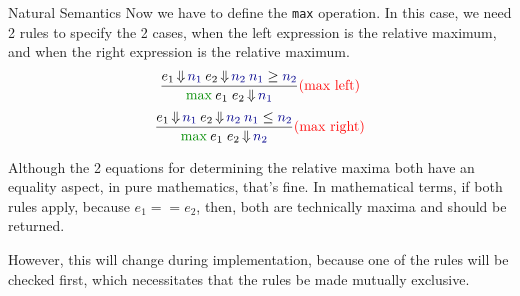 \begin{example}[Lecture 3]{Natural Semantics}
  Now we have to define the \texttt{max} operation.
  In this case, we need 2 rules to specify the 2 cases, when the left expression is the relative maximum, and when the right expression is the relative maximum.
  \begin{equation*}
    \frac{e_{1} \EvaluatesTo \textcolor{Blue4}{n_{1}} \: e_{2} \EvaluatesTo \textcolor{Blue4}{n_{2}} \: \textcolor{Blue4}{n_{1}} \geq \textcolor{Blue4}{n_{2}}}{\textcolor{Green4}{\mathtt{\max}} \: e_{1} \; e_{2} \EvaluatesTo \textcolor{Blue4}{n_{1}}} \textcolor{red}{(\text{max left})}
  \end{equation*}
  \begin{equation*}
    \frac{e_{1} \EvaluatesTo \textcolor{Blue4}{n_{1}} \: e_{2} \EvaluatesTo \textcolor{Blue4}{n_{2}} \: \textcolor{Blue4}{n_{1}} \leq \textcolor{Blue4}{n_{2}}}{\textcolor{Green4}{\mathtt{\max}} \: e_{1} \; e_{2} \EvaluatesTo \textcolor{Blue4}{n_{2}}} \textcolor{red}{(\text{max right})}
  \end{equation*}
  \begin{remark*}
    Although the 2 equations for determining the relative maxima both have an equality aspect, in pure mathematics, that's fine.
    In mathematical terms, if both rules apply, because $e_{1} == e_{2}$, then, both are technically maxima and should be returned.

    However, this will change during implementation, because one of the rules will be checked first, which necessitates that the rules be made mutually exclusive.
  \end{remark*}


\end{example}
